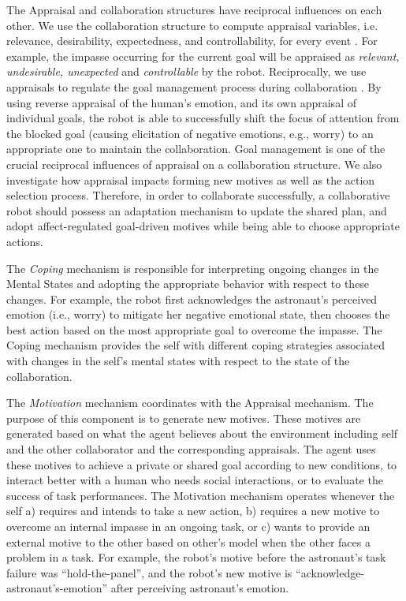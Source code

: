 \documentclass[letterpaper]{article}
\begin{document}
The Appraisal and collaboration structures have reciprocal influences on each
other. We use the collaboration structure to compute appraisal variables, i.e.
relevance, desirability, expectedness, and controllability, for every event
\cite{shayganfar:appraisal}. For example, the impasse occurring for the
current goal will be appraised as \textit{relevant, undesirable, unexpected}
and \textit{controllable} by the robot. Reciprocally, we use appraisals to
regulate the goal management process during collaboration
\cite{shayganfar:goal-management}. By using reverse appraisal
\cite{gratch:reverse-appraisal} of the human's emotion, and its own appraisal of
individual goals, the robot is able to successfully shift the focus of attention
from the blocked goal (causing elicitation of negative emotions, e.g., worry) to
an appropriate one to maintain the collaboration. Goal management is one of the
crucial reciprocal influences of appraisal on a collaboration structure. We also
investigate how appraisal impacts forming new motives as well as the action
selection process. Therefore, in order to collaborate successfully, a
collaborative robot should possess an adaptation mechanism to update the shared
plan, and adopt affect-regulated goal-driven motives while being able to choose
appropriate actions.

The \textit{Coping} mechanism is responsible for interpreting ongoing changes
in the Mental States and adopting the appropriate behavior with respect to these
changes. For example, the robot first acknowledges the astronaut's perceived
emotion (i.e., worry) to mitigate her negative emotional state, then chooses the
best action based on the most appropriate goal to overcome the impasse. The
Coping mechanism provides the self with different coping strategies associated
with changes in the self's mental states with respect to the state of the
collaboration.

The \textit{Motivation} mechanism coordinates with the Appraisal mechanism. The
purpose of this component is to generate new motives. These motives are
generated based on what the agent believes about the environment including self
and the other collaborator and the corresponding appraisals. The agent uses
these motives to achieve a private or shared goal according to new conditions,
to interact better with a human who needs social interactions, or to evaluate
the success of task performances. The Motivation mechanism operates whenever the
self a) requires and intends to take a new action, b) requires a new motive to
overcome an internal impasse in an ongoing task, or c) wants to provide an
external motive to the other based on other's model when the other faces a
problem in a task. For example, the robot's motive before the astronaut's task
failure was ``hold-the-panel'', and the robot's new motive is
``acknowledge-astronaut's-emotion'' after perceiving astronaut's emotion.
\end{document}
